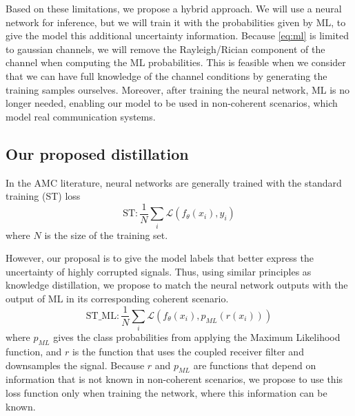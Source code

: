 \documentclass[conference]{IEEEtran}
\newcommand{\Ls}{\mathcal{L}}
\begin{document}
Based on these limitations, we propose a hybrid approach. We will use a neural network for inference, but we will train it with the probabilities given by ML, to give the model this additional uncertainty information. Because \eqref{eq:ml} is limited to gaussian channels, we will remove the Rayleigh/Rician component of the channel when computing the ML probabilities. This is feasible when we consider that we can have full knowledge of the channel conditions by generating the training samples ourselves. Moreover, after training the neural network, ML is no longer needed, enabling our model to be used in non-coherent scenarios, which model real communication systems.


\subsection{Our proposed distillation}

In the AMC literature, neural networks are generally trained with the standard training (ST) loss
\begin{equation}
    \text{ST} : \dfrac{1}{N}\sum_{i}\Ls(f_{\theta}(x_i), y_i)
\end{equation}
where $N$ is the size of the training set.

However, our proposal is to give the model labels that better express the uncertainty of highly corrupted signals. Thus, using similar principles as knowledge distillation, we propose to match the neural network outputs with the output of ML in its corresponding coherent scenario.
\begin{equation}
    \text{ST\_ML} : \dfrac{1}{N}\sum_{i}\Ls(f_{\theta}(x_i), p_{ML}(r(x_i)))
\label{eq:st_ml}
\end{equation}
where $p_{ML}$ gives the class probabilities from applying the Maximum Likelihood function, and $r$ is the function that uses the coupled receiver filter and downsamples the signal. Because $r$ and $p_{ML}$ are functions that depend on information that is not known in non-coherent scenarios, we propose to use this loss function only when training the network, where this information can be known.
\end{document}
